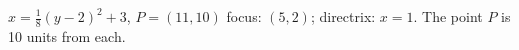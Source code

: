 {$x=\frac18(y-2)^2+3$, $P=(11,10)$
}
{focus: $(5,2)$; directrix: $x=1$. The point $P$ is 10 units from each.
}
